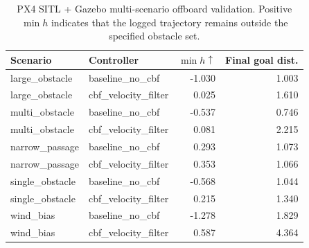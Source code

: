 \begin{table}[t]
\caption{PX4 SITL + Gazebo multi-scenario offboard validation. Positive $\min h$ indicates that the logged trajectory remains outside the specified obstacle set.}
\label{tab:px4_multiscenario}
\centering
\begin{tabular}{llrr}
\toprule
Scenario & Controller & $\min h \uparrow$ & Final goal dist. \\
\midrule
large\_obstacle & baseline\_no\_cbf & -1.030 & 1.003 \\
large\_obstacle & cbf\_velocity\_filter & 0.025 & 1.610 \\
multi\_obstacle & baseline\_no\_cbf & -0.537 & 0.746 \\
multi\_obstacle & cbf\_velocity\_filter & 0.081 & 2.215 \\
narrow\_passage & baseline\_no\_cbf & 0.293 & 1.073 \\
narrow\_passage & cbf\_velocity\_filter & 0.353 & 1.066 \\
single\_obstacle & baseline\_no\_cbf & -0.568 & 1.044 \\
single\_obstacle & cbf\_velocity\_filter & 0.215 & 1.340 \\
wind\_bias & baseline\_no\_cbf & -1.278 & 1.829 \\
wind\_bias & cbf\_velocity\_filter & 0.587 & 4.364 \\
\bottomrule
\end{tabular}
\end{table}
